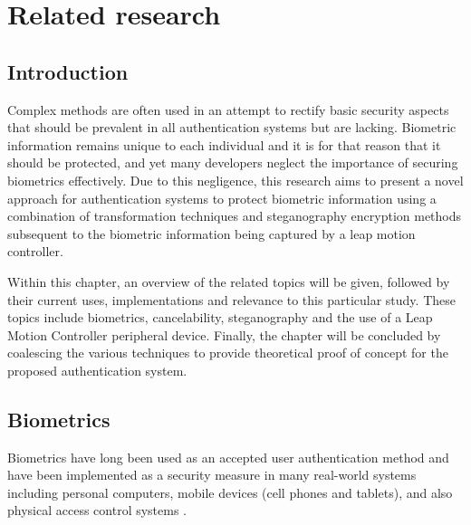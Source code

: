 
\chapter{Related research}



\section[Introduction]{Introduction}
Complex methods are often used in an attempt to rectify basic security aspects that should be prevalent in all authentication systems but are lacking. Biometric information remains unique to each individual and it is for that reason that it should be protected, and yet many developers neglect the importance of securing biometrics effectively. Due to this negligence, this research aims to present a novel approach for authentication systems to protect biometric information using a combination of transformation techniques and steganography encryption methods subsequent to the biometric information being captured by a leap motion controller. 

Within this chapter, an overview of the related topics will be given, followed by their current uses, implementations and relevance to this particular study. These topics include biometrics, cancelability, steganography and the use of a Leap Motion Controller peripheral device. Finally, the chapter will be concluded by coalescing the various techniques to provide theoretical proof of concept for the proposed authentication system.


\section[Biometrics]{Biometrics}
Biometrics have long been used as an accepted user authentication method and have been implemented as a security measure in many real-world systems including personal computers, mobile devices (cell phones and tablets), and also physical access control systems \citep{Shahim2016}.

